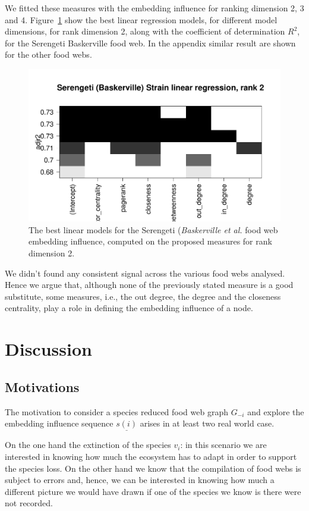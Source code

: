 \documentclass[12pt]{article}
\theoremstyle{definition}
\begin{document}
We fitted these measures with the embedding influence for ranking dimension 2, 3 and 4. Figure~\ref{fig:rs_S_B_2} show the best linear regression models, for different model dimensions, for rank dimension 2, along with the coefficient of determination $R^2$, for the Serengeti Baskerville food web. In the appendix similar result are shown for the other food webs.
\begin{figure}[!htb]
\centering
  \includegraphics[width=\linewidth]{Images/B_S_R_2}
\caption{The best linear models for the Serengeti (\textit{Baskerville et al.} food web embedding influence, computed on the proposed measures for rank dimension 2.}\label{fig:rs_S_B_2}
\end{figure}

We didn't found any consistent signal across the various food webs analysed. Hence we argue that, although none of the previously stated measure is a good substitute, some measures, i.e., the out degree, the degree and the closeness centrality, play a role in defining the embedding influence of a node.

\section{Discussion}

\subsection{Motivations}
The motivation to consider a species reduced food web graph $G_{-i}$ and explore the embedding influence sequence $\underline{s(i)}$ arises in at least two real world case.

On the one hand the extinction of the species $v_i$: in this scenario we are interested in knowing how much the ecosystem has to adapt in order to support the species loss. On the other hand we know that the compilation of food webs is subject to errors and, hence, we can be interested in knowing how much a different picture we would have drawn if one of the species we know is there were not recorded.
\end{document}
